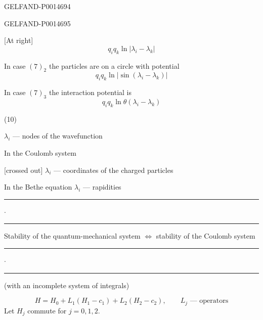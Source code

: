\begin{GelfandAdjacentEvidence}{GELFAND-P001469}{4}

\end{GelfandAdjacentEvidence}
\begin{GelfandAdjacentEvidence}{GELFAND-P001469}{5}


[At right] 
\[
q_iq_k\ln|\lambda_i-\lambda_k|
\]

In case \((7)_2\)
the particles are on a circle with potential
\[
q_iq_k\ln|\sin(\lambda_i-\lambda_k)|
\]

In case \((7)_3\) the interaction potential is
\[
q_iq_k\ln\theta(\lambda_i-\lambda_k)
\]

(10) 

\(\lambda_i\) --- nodes of the wavefunction

In the Coulomb system

[crossed out] \(\lambda_i\) --- coordinates of the charged particles
\end{GelfandAdjacentEvidence}


In the Bethe equation \(\lambda_i\) --- rapidities

\begin{center}
\rule{2cm}{.4pt}\quad\(\cdot\)\quad\rule{2cm}{.4pt}
\end{center}

Stability of the quantum-mechanical system \(\Leftrightarrow\) stability of the Coulomb system

\begin{center}
\rule{2cm}{.4pt}\quad\(\cdot\)\quad\rule{2cm}{.4pt}
\end{center}

 (with an incomplete system of integrals)

\begin{equation*}
H=H_0+L_1(H_1-c_1)+L_2(H_2-c_2),\qquad L_j\text{ --- operators}
\tag{11}
\end{equation*}
Let \(H_j\) commute for \(j=0,1,2\).


